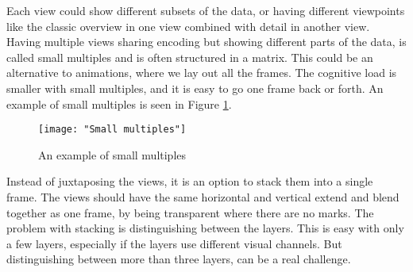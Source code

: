 \documentclass[Report.tex]{subfiles}
\begin{document}
Each view could show different subsets of the data, or having different viewpoints like the classic overview in one view  combined with detail in another view. 
Having multiple views sharing encoding but showing different parts of the data, is called small multiples and is often structured in a matrix. This could be an alternative to animations, where we lay out all the frames. The cognitive load is smaller with small multiples, and it is easy to go one frame back or forth. An example of small multiples is seen in Figure \ref{fig:smallmultiples}.
\begin{figure}
\center
\texttt{[image: "Small multiples"]}
\caption{An example of small multiples}
\label{fig:smallmultiples}
\end{figure}
Instead of juxtaposing the views, it is an option to stack them into a single frame. The views should have the same horizontal and vertical extend and blend together as one frame, by being transparent where there are no marks. The problem with stacking is distinguishing between the layers. This is easy with only a few layers, especially if the layers use different visual channels. But distinguishing between more than three layers, can be a real challenge. \cite[Chapter 12]{Tamara}
\end{document}
